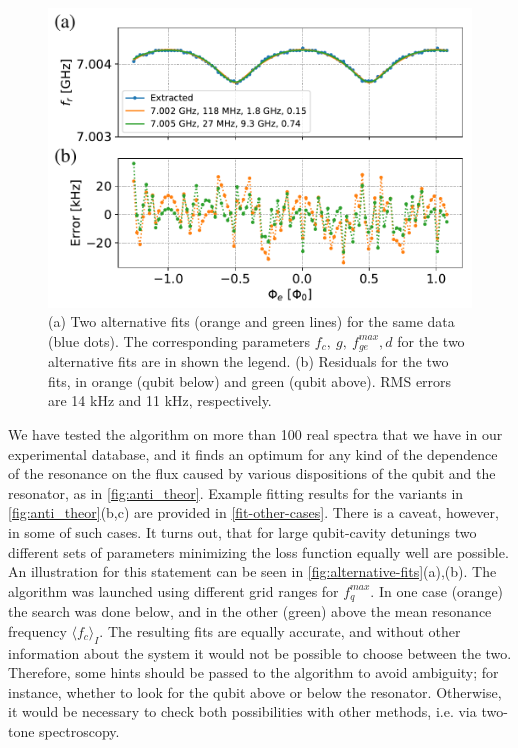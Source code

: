 \documentclass[%
 aip,
 draft,
 amsmath,amssymb,
 reprint,%
]{revtex4-1}
\begin{document}
\begin{figure}
	\centering
	\includegraphics[width=\linewidth]{alternative_fits}
	\caption{(a) Two alternative fits (orange and green lines) for the same data (blue dots). The corresponding parameters $f_c,\ g,\ f_{ge}^{max}, d$ for the two alternative fits are in shown the legend. (b) Residuals for the two fits, in orange (qubit below) and green (qubit above). RMS errors are 14 kHz and 11 kHz, respectively.}
	\label{fig:alternative-fits}
\end{figure}

We have tested the algorithm on more than 100 real spectra that we have in our experimental database, and it finds an optimum for any kind of the dependence of the resonance on the flux caused by various dispositions of the qubit and the resonator, as in \autoref{fig:anti_theor}. Example fitting results for the variants in \autoref{fig:anti_theor}(b,c) are provided in \autoref{fit-other-cases}. There is a caveat, however, in some of such cases. It turns out, that for large qubit-cavity detunings two different sets of parameters minimizing the loss function equally well are possible. An illustration for this statement can be seen in \autoref{fig:alternative-fits}(a),(b). The algorithm was launched using different grid ranges for $f_q^{max}$. In one case (orange) the search was done below, and in the other (green) above the mean resonance frequency $\langle f_c\rangle_{I}$. The resulting fits are equally accurate, and without other information about the system it would not be possible to choose between the two. Therefore, some hints should be passed to the algorithm to avoid ambiguity; for instance, whether to look for the qubit above or below the resonator. Otherwise, it would be necessary to check both possibilities with other methods, i.e. via two-tone spectroscopy.
\end{document}
